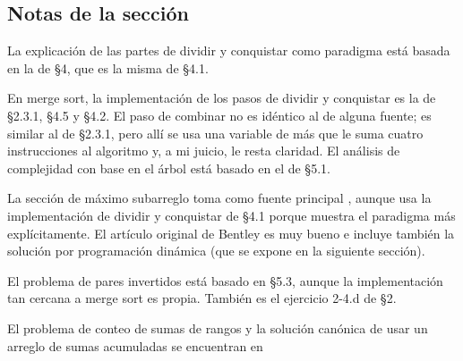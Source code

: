 \subsection*{Notas de la sección}

La explicación de las partes de dividir y conquistar como paradigma está basada en la de \textcite{cormen} \S 4, que es la misma de \textcite{cardoso} \S 4.1.

En merge sort, la implementación de los pasos de dividir y conquistar es la de \textcite{cormen} \S 2.3.1, \textcite{skiena} \S 4.5 y \textcite{cardoso} \S 4.2. El paso de combinar no es idéntico al de alguna fuente; es similar al de \textcite{cormen2022} \S 2.3.1, pero allí se usa una variable de más que le suma cuatro instrucciones al algoritmo y, a mi juicio, le resta claridad. El análisis de complejidad con base en el árbol está basado en el de \textcite{kleinberg} \S 5.1.

La sección de máximo subarreglo toma como fuente principal \textcite{bentley}, aunque usa la implementación de dividir y conquistar de \textcite{cormen} \S 4.1 porque muestra el paradigma más explícitamente. El artículo original de Bentley es muy bueno e incluye también la solución por programación dinámica (que se expone en la siguiente sección).

El problema de pares invertidos está basado en \textcite{kleinberg} \S 5.3, aunque la implementación tan cercana a merge sort es propia. También es el ejercicio 2-4.d de \textcite{cormen} \S 2.

El problema de conteo de sumas de rangos y la solución canónica de usar un arreglo de sumas acumuladas se encuentran en %
